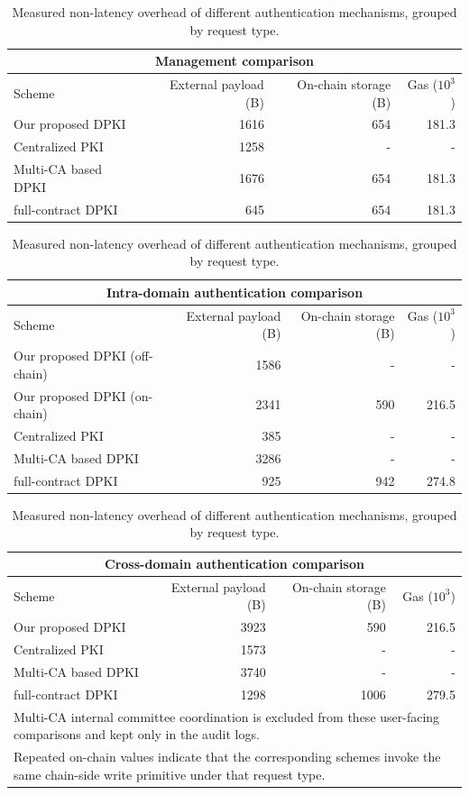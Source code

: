 \begin{table}[t]
\centering
\caption{Measured non-latency overhead of different authentication mechanisms, grouped by request type.}
\label{tab:resource-overhead-v4}
\scriptsize
\setlength{\tabcolsep}{4.5pt}

\begin{tabular}{lrrr}
\hline
\multicolumn{4}{c}{Management comparison} \\
\hline
Scheme & External payload (B) & On-chain storage (B) & Gas ($10^3$) \\
\hline
Our proposed DPKI & 1616 & 654 & 181.3 \\
Centralized PKI & 1258 & - & - \\
Multi-CA based DPKI & 1676 & 654 & 181.3 \\
full-contract DPKI & 645 & 654 & 181.3 \\
\hline
\end{tabular}

\vspace{0.5em}

\begin{tabular}{lrrr}
\hline
\multicolumn{4}{c}{Intra-domain authentication comparison} \\
\hline
Scheme & External payload (B) & On-chain storage (B) & Gas ($10^3$) \\
\hline
Our proposed DPKI (off-chain) & 1586 & - & - \\
Our proposed DPKI (on-chain) & 2341 & 590 & 216.5 \\
Centralized PKI & 385 & - & - \\
Multi-CA based DPKI & 3286 & - & - \\
full-contract DPKI & 925 & 942 & 274.8 \\
\hline
\end{tabular}

\vspace{0.5em}

\begin{tabular}{lrrr}
\hline
\multicolumn{4}{c}{Cross-domain authentication comparison} \\
\hline
Scheme & External payload (B) & On-chain storage (B) & Gas ($10^3$) \\
\hline
Our proposed DPKI & 3923 & 590 & 216.5 \\
Centralized PKI & 1573 & - & - \\
Multi-CA based DPKI & 3740 & - & - \\
full-contract DPKI & 1298 & 1006 & 279.5 \\
\hline
\multicolumn{4}{l}{\footnotesize Multi-CA internal committee coordination is excluded from these user-facing comparisons and kept only in the audit logs.}\\
\multicolumn{4}{l}{\footnotesize Repeated on-chain values indicate that the corresponding schemes invoke the same chain-side write primitive under that request type.}
\end{tabular}
\end{table}
